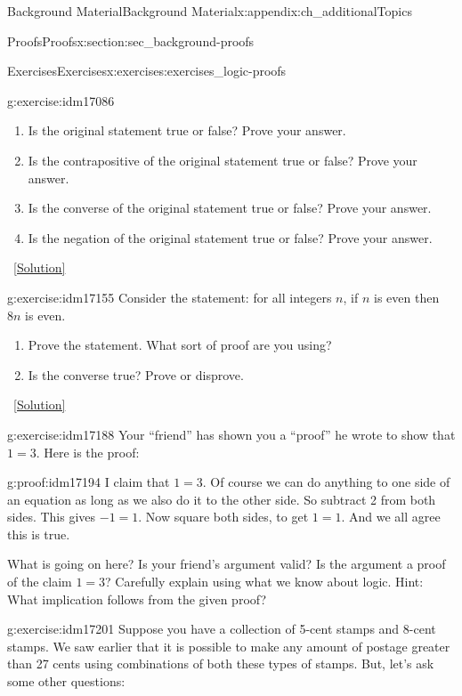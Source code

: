 \documentclass[oneside,10pt,]{book}
\numberwithin{equation}{chapter}
\begin{document}
\begin{appendixptx}{Background Material}{}{Background Material}{}{}{x:appendix:ch_additionalTopics}
\begin{sectionptx}{Proofs}{}{Proofs}{}{}{x:section:sec_background-proofs}
\begin{exercises-subsection}{Exercises}{}{Exercises}{}{}{x:exercises:exercises_logic-proofs}
\begin{divisionexercise}{1}{}{}{g:exercise:idm17086}
\begin{enumerate}[label=(\alph*)]
\item{}Is the original statement true or false? Prove your answer.%
\item{}Is the contrapositive of the original statement true or false? Prove your answer.%
\item{}Is the converse of the original statement true or false? Prove your answer.%
\item{}Is the negation of the original statement true or false? Prove your answer.%
\end{enumerate}
%
\qquad~\hfill{\tiny\hyperlink{g:solution:idm17111-main}{[Solution]}}\end{divisionexercise}%
\begin{divisionexercise}{2}{}{}{g:exercise:idm17155}%
Consider the statement: for all integers \(n\), if \(n\) is even then \(8n\) is even.%
\par
%
\begin{enumerate}[label=(\alph*)]
\item{}Prove the statement. What sort of proof are you using?%
\item{}Is the converse true? Prove or disprove.%
\end{enumerate}
%
\qquad~\hfill{\tiny\hyperlink{g:solution:idm17167-main}{[Solution]}}\end{divisionexercise}%
\begin{divisionexercise}{3}{}{}{g:exercise:idm17188}%
Your ``friend'' has shown you a ``proof'' he wrote to show that \(1 = 3\). Here is the proof:%
\begin{proofptx}{}{g:proof:idm17194}
I claim that \(1 = 3\). Of course we can do anything to one side of an equation as long as we also do it to the other side. So subtract 2 from both sides. This gives \(-1 = 1\). Now square both sides, to get \(1 = 1\). And we all agree this is true.%
\end{proofptx}
What is going on here? Is your friend's argument valid? Is the argument a proof of the claim \(1=3\)? Carefully explain using what we know about logic. Hint: What implication follows from the given proof?%
\end{divisionexercise}%
\begin{divisionexercise}{4}{}{}{g:exercise:idm17201}%
Suppose you have a collection of 5-cent stamps and 8-cent stamps. We saw earlier that it is possible to make any amount of postage greater than 27 cents using combinations of both these types of stamps. But, let's ask some other questions:%
\begin{enumerate}[label=(\alph*)]

\end{enumerate}
\end{divisionexercise}
\end{exercises-subsection}
\end{sectionptx}
\end{appendixptx}
\end{document}
